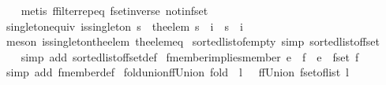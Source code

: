 \begin{isabellebody}
%
\isadelimproof
\ \ %
\endisadelimproof
%
\isatagproof
{}\isamarkupfalse%
\ {\isacharparenleft}metis\ ffilter{\isachardot}rep{\isacharunderscore}eq\ fset{\isacharunderscore}inverse\ notin{\isacharunderscore}fset{\isacharparenright}%
\endisatagproof
{\isafoldproof}%
%
\isadelimproof
\isanewline
%
\endisadelimproof
\isanewline
{}\isamarkupfalse%
\ singleton{\isacharunderscore}equiv{\isacharcolon}\ {\isachardoublequoteopen}is{\isacharunderscore}singleton\ s\ {\isasymLongrightarrow}\ {\isacharparenleft}the{\isacharunderscore}elem\ s\ {\isacharequal}\ i{\isacharparenright}\ {\isacharequal}\ {\isacharparenleft}s\ {\isacharequal}\ {\isacharbraceleft}i{\isacharbraceright}{\isacharparenright}{\isachardoublequoteclose}\isanewline
%
\isadelimproof
\ \ %
\endisadelimproof
%
\isatagproof
{}\isamarkupfalse%
\ {\isacharparenleft}meson\ is{\isacharunderscore}singleton{\isacharunderscore}the{\isacharunderscore}elem\ the{\isacharunderscore}elem{\isacharunderscore}eq{\isacharparenright}%
\endisatagproof
{\isafoldproof}%
%
\isadelimproof
\isanewline
%
\endisadelimproof
\isanewline
{}\isamarkupfalse%
\ sorted{\isacharunderscore}list{\isacharunderscore}of{\isacharunderscore}empty\ {\isacharbrackleft}simp{\isacharbrackright}{\isacharcolon}\ {\isachardoublequoteopen}sorted{\isacharunderscore}list{\isacharunderscore}of{\isacharunderscore}fset\ {\isacharbraceleft}{\isacharbar}{\isacharbar}{\isacharbraceright}\ {\isacharequal}\ {\isacharbrackleft}{\isacharbrackright}{\isachardoublequoteclose}\isanewline
%
\isadelimproof
\ \ %
\endisadelimproof
%
\isatagproof
{}\isamarkupfalse%
\ {\isacharparenleft}simp\ add{\isacharcolon}\ sorted{\isacharunderscore}list{\isacharunderscore}of{\isacharunderscore}fset{\isacharunderscore}def{\isacharparenright}%
\endisatagproof
{\isafoldproof}%
%
\isadelimproof
\isanewline
%
\endisadelimproof
\isanewline
{}\isamarkupfalse%
\ fmember{\isacharunderscore}implies{\isacharunderscore}member{\isacharcolon}\ {\isachardoublequoteopen}e\ {\isacharbar}{\isasymin}{\isacharbar}\ f\ {\isasymLongrightarrow}\ e\ {\isasymin}\ fset\ f{\isachardoublequoteclose}\isanewline
%
\isadelimproof
\ \ %
\endisadelimproof
%
\isatagproof
{}\isamarkupfalse%
\ {\isacharparenleft}simp\ add{\isacharcolon}\ fmember{\isacharunderscore}def{\isacharparenright}%
\endisatagproof
{\isafoldproof}%
%
\isadelimproof
\isanewline
%
\endisadelimproof
\isanewline
{}\isamarkupfalse%
\ fold{\isacharunderscore}union{\isacharunderscore}ffUnion{\isacharcolon}\ {\isachardoublequoteopen}fold\ {\isacharparenleft}{\isacharbar}{\isasymunion}{\isacharbar}{\isacharparenright}\ l\ {\isacharbraceleft}{\isacharbar}{\isacharbar}{\isacharbraceright}\ {\isacharequal}\ ffUnion\ {\isacharparenleft}fset{\isacharunderscore}of{\isacharunderscore}list\ l{\isacharparenright}{\isachardoublequoteclose}\isanewline

\end{isabellebody}
